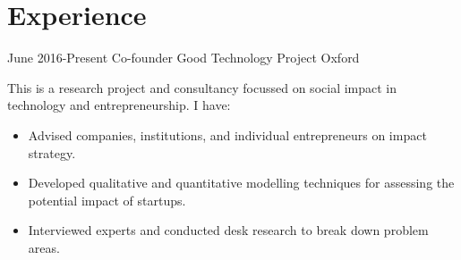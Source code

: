 \documentclass[12pt,a4paper,sans]{moderncv}
\begin{document}
\maketitle

\section{Experience}
\cventry
{June 2016-Present}
{Co-founder}
{Good Technology Project}
{Oxford}
{}
{
  This is a research project and consultancy focussed on social impact in technology and
  entrepreneurship. I have:
  \begin{itemize}
    \item Advised companies, institutions, and individual entrepreneurs on impact strategy.
    \item Developed qualitative and quantitative modelling techniques for
      assessing the potential impact of startups.
    \item Interviewed experts and conducted desk research to break down problem areas.
  \end{itemize}
}
\end{document}
